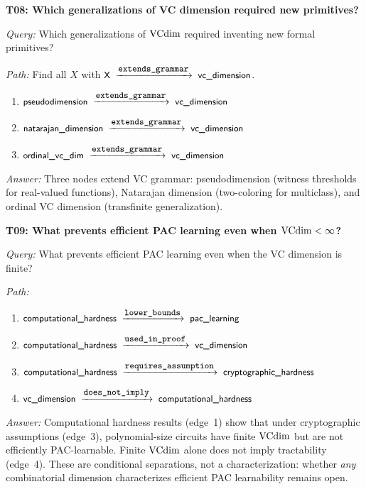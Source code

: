 \begin{traversal}
\textbf{T08: Which generalizations of VC dimension required new primitives?}\par\medskip
\emph{Query:} Which generalizations of $\mathrm{VCdim}$ required inventing new formal primitives?\par
\emph{Path:} Find all $X$ with $\edge{X}{extends\_grammar}{vc\_dimension}$.\par
\begin{enumerate}[leftmargin=2em, nosep]
  \item $\edge{pseudodimension}{extends\_grammar}{vc\_dimension}$
  \item $\edge{natarajan\_dimension}{extends\_grammar}{vc\_dimension}$
  \item $\edge{ordinal\_vc\_dim}{extends\_grammar}{vc\_dimension}$
\end{enumerate}
\emph{Answer:} Three nodes extend VC grammar: pseudodimension (witness thresholds for real-valued functions), Natarajan dimension (two-coloring for multiclass), and ordinal VC dimension (transfinite generalization).
\end{traversal}

\begin{traversal}
\textbf{T09: What prevents efficient PAC learning even when $\mathrm{VCdim} < \infty$?}\par\medskip
\emph{Query:} What prevents efficient PAC learning even when the VC dimension is finite?\par
\emph{Path:}\par
\begin{enumerate}[leftmargin=2em, nosep]
  \item $\edge{computational\_hardness}{lower\_bounds}{pac\_learning}$ \cite{KearnsValiant1994}
  \item $\edge{computational\_hardness}{used\_in\_proof}{vc\_dimension}$
  \item $\edge{computational\_hardness}{requires\_assumption}{cryptographic\_hardness}$ \cite{ApplebaumBarakXiao2008}
  \item $\edge{vc\_dimension}{does\_not\_imply}{computational\_hardness}$ \cite{KearnsValiant1994}
\end{enumerate}
\emph{Answer:} Computational hardness results (edge~1) show that under cryptographic assumptions (edge~3), polynomial-size circuits have finite $\mathrm{VCdim}$ but are not efficiently PAC-learnable. Finite $\mathrm{VCdim}$ alone does not imply tractability (edge~4).  These are conditional separations, not a characterization: whether \emph{any} combinatorial dimension characterizes efficient PAC learnability remains open.
\end{traversal}

